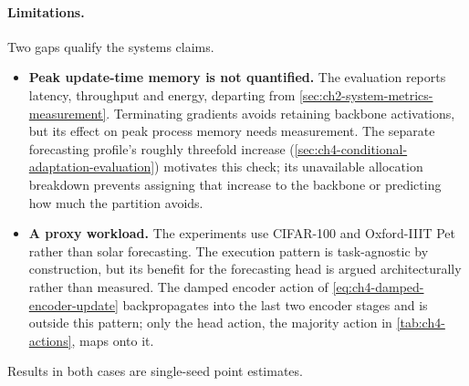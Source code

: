 \paragraph{Limitations.} Two gaps qualify the systems claims.
\begin{itemize}
  \item \textbf{Peak update-time memory is not quantified.} The evaluation reports latency, throughput and energy, departing from \cref{sec:ch2-system-metrics-measurement}. Terminating gradients avoids retaining backbone activations, but its effect on peak process memory needs measurement. The separate forecasting profile's roughly threefold increase (\cref{sec:ch4-conditional-adaptation-evaluation}) motivates this check; its unavailable allocation breakdown prevents assigning that increase to the backbone or predicting how much the partition avoids.
  \item \textbf{A proxy workload.} The experiments use CIFAR-100 and Oxford-IIIT Pet rather than solar forecasting. The execution pattern is task-agnostic by construction, but its benefit for the forecasting head is argued architecturally rather than measured. The damped encoder action of \cref{eq:ch4-damped-encoder-update} backpropagates into the last two encoder stages and is outside this pattern; only the head action, the majority action in \cref{tab:ch4-actions}, maps onto it.
\end{itemize}
\noindent Results in both cases are single-seed point estimates.


